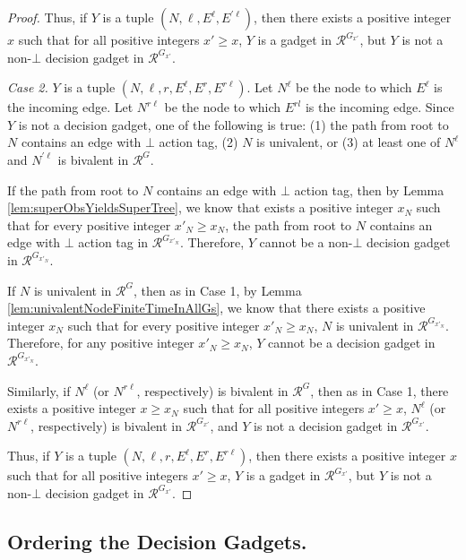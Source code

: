 \documentclass[11pt]{article}
\numberwithin{theorem}{section}
\begin{document}
\begin{proof}
Thus, if $Y$ is a tuple $(N,\ell,E^\ell,E^{\prime \ell})$, then there exists a positive integer $x$ such that for all positive integers $x' \geq x$, $Y$ is a gadget in $\mathcal{R}^{G_{x'}}$, but $Y$ is not a non-$\bot$ decision gadget in $\mathcal{R}^{G_{x'}}$.

\emph{Case 2.} $Y$ is a tuple $(N,\ell,r,E^\ell,E^r,E^{r\ell})$. Let $N^\ell$ be the node to which $E^\ell$ is the incoming edge.
Let $N^{r\ell}$ be the node to which $E^{rl}$ is the incoming edge. Since $Y$ is not a decision gadget, one of the following is true: (1) the path from root to $N$ contains an edge with $\bot$ action tag, (2) $N$ is univalent,  or (3) at least one of $N^\ell$ and $N^{\prime \ell}$ is bivalent in $\mathcal{R}^{G}$.

If the path from root to $N$ contains an edge with $\bot$ action tag, then by Lemma \ref{lem:superObsYieldsSuperTree}, we know that  exists a positive integer $x_N$ such that for every positive integer $x'_N \geq x_N$, the path from root to $N$ contains an edge with $\bot$ action tag in $\mathcal{R}^{G_{x'_N}}$. Therefore, $Y$ cannot be a non-$\bot$ decision gadget in $\mathcal{R}^{G_{x'_N}}$.


If $N$ is univalent in $\mathcal{R}^{G}$, then as in Case 1, by Lemma \ref{lem:univalentNodeFiniteTimeInAllGs}, we know that there exists a positive integer $x_N$ such that for every positive integer $x'_N \geq x_N$, $N$ is univalent in $\mathcal{R}^{G_{x'_N}}$. Therefore, for any positive integer $x'_N \geq x_N$, $Y$ cannot be a decision gadget in $\mathcal{R}^{G_{x'_N}}$.

Similarly, if $N^\ell$ (or $N^{r \ell}$, respectively) is bivalent in $\mathcal{R}^{G}$, then as in Case 1,  there exists a positive integer $x \geq x_N$ such that for all positive integers $x' \geq x$, $N^\ell$ (or $N^{r \ell}$, respectively) is bivalent in $\mathcal{R}^{G_{x'}}$, and $Y$ is not a decision gadget in $\mathcal{R}^{G_{x'}}$. 

Thus, if $Y$ is a tuple $(N,\ell,r,E^\ell,E^r,E^{r\ell})$, then there exists a positive integer $x$ such that for all positive integers $x' \geq x$, $Y$ is a gadget in $\mathcal{R}^{G_{x'}}$, but $Y$ is not a non-$\bot$ decision gadget in $\mathcal{R}^{G_{x'}}$.
\end{proof}










\subsection{Ordering the Decision Gadgets.}
\end{document}
